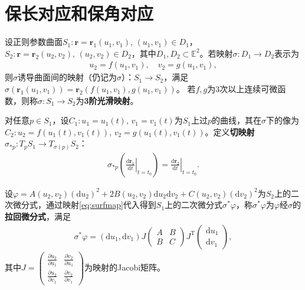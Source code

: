\documentclass[../../main.tex]{subfiles}%
\begin{document}
\section{保长对应和保角对应}

\begin{definition}
设正则参数曲面$S_1:\boldsymbol{r}=\boldsymbol{r}_1(u_1,v_1),\,(u_1,v_1)\in D_1$，$S_2:\boldsymbol{r}=\boldsymbol{r}_2(u_2,v_2),\,(u_2,v_2)\in D_2$，其中$D_1,D_2\subset\mathbb{E}^2$。若映射$\sigma:D_1\to D_2$表示为
\begin{align}
u_2=f(u_1,v_1),\quad v_2=g(u_1,v_1),\label{eq:surfmap}
\end{align}
则$\sigma$诱导曲面间的映射（仍记为$\sigma$）：$S_1\to S_2$，满足$\sigma(\boldsymbol{r}_1(u_1,v_1))=\boldsymbol{r}_2(f(u_1,v_1),g(u_1,v_1))$。
若$f,g$为$3$次以上连续可微函数，则称$\sigma:S_1\to S_2$为\textbf{3阶光滑映射}。

对任意$p\in S_1$，设$C_1:u_1=u_1(t),\,v_1=v_1(t)$为$S_1$上过$p$的曲线，其在$\sigma$下的像为$C_2:u_2=f(u_1(t),v_1(t)),\,v_2=g(u_1(t),v_1(t))$。定义\textbf{切映射}$\sigma_{*p}:T_pS_1\to T_{\sigma(p)}S_2$：
\begin{align}
\sigma_{*p}\left(\left.\frac{\mathrm{d}\boldsymbol{r}_1}{\mathrm{d}t}\right|_{t=t_0}\right)=\left.\frac{\mathrm{d}\boldsymbol{r}_2}{\mathrm{d}t}\right|_{t=t_0}.\label{eq:tangentmap}
\end{align}

设$\varphi=A(u_2,v_2)(\mathrm{d}u_2)^2+2B(u_2,v_2)\mathrm{d}u_2\mathrm{d}v_2+C(u_2,v_2)(\mathrm{d}v_2)^2$为$S_2$上的二次微分式，通过映射\eqref{eq:surfmap}代入得到$S_1$上的二次微分式$\sigma^*\varphi$，称$\sigma^*\varphi$为$\varphi$经$\sigma$的\textbf{拉回微分式}，满足
\begin{align*}
\sigma^*\varphi=(\mathrm{d}u_1,\mathrm{d}v_1)J\begin{pmatrix}A&B\\B&C\end{pmatrix}J^\mathrm{T}\begin{pmatrix}\mathrm{d}u_1\\\mathrm{d}v_1\end{pmatrix},
\end{align*}
其中$J=\begin{pmatrix}\frac{\partial u_2}{\partial u_1}&\frac{\partial v_2}{\partial u_1}\\[4pt]\frac{\partial u_2}{\partial v_1}&\frac{\partial v_2}{\partial v_1}\end{pmatrix}$为映射的Jacobi矩阵。
\end{definition}
\end{document}
